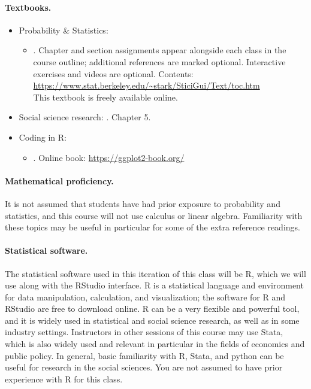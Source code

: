 \documentclass[letterpaper, 12pt, parskip=full,DIV=10]{scrartcl}
\begin{document}
\paragraph{Textbooks.}
\begin{itemize}
\item Probability \& Statistics:
\begin{itemize}
\item {}. Chapter and section assignments appear alongside each class in the course outline; additional references are marked optional. Interactive exercises and videos are optional. Contents: \url{https://www.stat.berkeley.edu/~stark/SticiGui/Text/toc.htm}\\
This textbook is freely available online. 
\end{itemize}
\item Social science research: . Chapter 5.
\item Coding in R:
\begin{itemize}
\item {}. Online book: \url{https://ggplot2-book.org/}
\end{itemize}
\end{itemize}

\paragraph{Mathematical proficiency.}
It is not assumed that students have had prior exposure to probability and statistics, and this course will not use calculus or linear algebra.
Familiarity with these topics may be useful in particular for some of the extra reference readings.

\paragraph{Statistical software.}
The statistical software used in this iteration of this class will be R, which we will use along with the RStudio interface.
R is a statistical language and environment for data manipulation, calculation, and visualization; the software for R and RStudio are free to download online.
R can be a very flexible and powerful tool, and it is widely used in statistical and social science research, as well as in some industry settings.
Instructors in other sessions of this course may use Stata, which is also widely used and relevant in particular in the fields of economics and public policy.
In general, basic familiarity with R, Stata, and python can be useful for research in the social sciences.
You are not assumed to have prior experience with R for this class.
\end{document}

